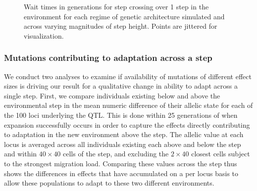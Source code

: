 \begin{figure}[h]
\centering
{}
\caption[Wait times for step crossing.]{Wait times in generations for step crossing over 1 step in the environment for each regime of genetic architecture simulated and across varying magnitudes of step height. Points are jittered for visualization.}
\label{fig:waittimes200}
\end{figure}


\subsubsection{Mutations contributing to adaptation across a step}

We conduct two analyses to examine if availability of mutations of different effect sizes is driving our result for a qualitative change in ability to adapt across a single step. %
First, we compare individuals existing below and above the environmental step in the mean numeric difference of their allelic state for each of the 100 loci underlying the QTL. This is done within 25 generations of when expansion successfully occurs in order to capture the effects directly contributing to adaptation in the new environment above the step. The allelic value at each locus is averaged across all individuals existing each above and below the step and within $40\times40$ cells of the step, and excluding the $2\times40$ closest cells subject to the strongest migration load. Comparing these values across the step thus shows the differences in effects that have accumulated on a per locus basis to allow these populations to adapt to these two different environments.


